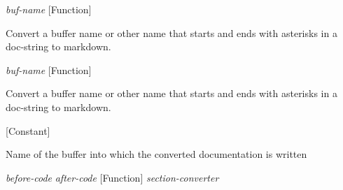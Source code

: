 \vspace{1em}
\noindent
{}
\usebox{\funcname}\emph{buf-name}
 \hfill [Function]

\begin{doc-string}
Convert a buffer name or other name that starts and ends with asterisks
 in a doc-string to markdown.
\end{doc-string}

\vspace{1em}
\noindent
{}
\usebox{\funcname}\emph{buf-name}
 \hfill [Function]

\begin{doc-string}
Convert a buffer name or other name that starts and ends with asterisks
 in a doc-string to markdown.
\end{doc-string}

\vspace{1em}
\noindent
{}
\usebox{\funcname}
 \hfill [Constant]

\begin{doc-string}
Name of the buffer into which the converted documentation is written
\end{doc-string}

\vspace{1em}
\noindent
{}
\usebox{\funcname}\emph{before-code} \emph{after-code}
 \hfill [Function]
\hspace*{\wd\funcname}\emph{section-converter}

